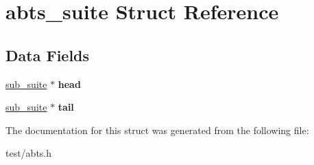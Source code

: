 \hypertarget{structabts__suite}{\section{abts\-\_\-suite Struct Reference}
\label{structabts__suite}
}
\subsection*{Data Fields}
\begin{DoxyCompactItemize}
\item 
\hypertarget{structabts__suite_aff45224ab9c8ad23ff6a0e13c1e162b1}{\hyperlink{structsub__suite}{sub\-\_\-suite} $\ast$ {\bfseries head}}\label{structabts__suite_aff45224ab9c8ad23ff6a0e13c1e162b1}

\item 
\hypertarget{structabts__suite_adbd9f923a8ebea16d9f4c99c8710555a}{\hyperlink{structsub__suite}{sub\-\_\-suite} $\ast$ {\bfseries tail}}\label{structabts__suite_adbd9f923a8ebea16d9f4c99c8710555a}

\end{DoxyCompactItemize}


The documentation for this struct was generated from the following file\-:\begin{DoxyCompactItemize}
\item 
test/abts.\-h\end{DoxyCompactItemize}
